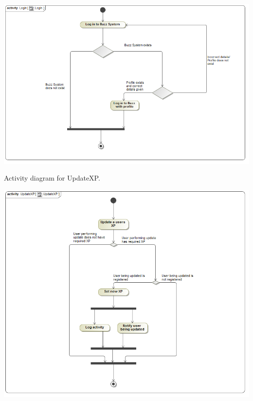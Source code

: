 \documentclass[pdftex,10pt,a4paper]{report}
\begin{document}
	\includegraphics[width=\textwidth]{Login}
	\newpage
		\begin{description}
		\item[Activity diagram for UpdateXP.] 
	\end{description}
	\includegraphics[width=\textwidth]{UpdateXP}
	
	
\end{document}
